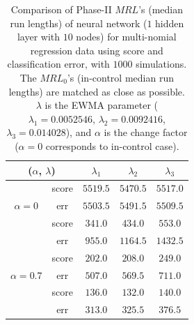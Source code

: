 \documentclass[twoside,11pt]{article}
\begin{document}
\begin{table}[!t]
\centering
\begin{tabular}{ccccc}
\toprule
\multicolumn{2}{c}{($ \alpha$, $ \lambda$)} & {$ \lambda_1$} & {$ \lambda_2$} & {$ \lambda_3$} \\
\midrule
\multirow{3}{*}{$\alpha=0$} & score &$5519.5$ & $5470.5$ & $5517.0$ \\
& err &$5503.5$ & $5491.5$ & $5509.5$ \\
\midrule
\multirow{3}{*}{$\alpha=0.5$} & score &$ \bm{341.0}$ & $\bm{434.0}$ & $\bm{553.0}$ \\
& err &$955.0$ & $1164.5$ & $1432.5$ \\
\midrule
\multirow{3}{*}{$\alpha=0.7$} & score &$\bm{202.0}$ & $\bm{208.0}$ & $\bm{249.0}$ \\
& err &$507.0$ & $569.5$ & $711.0$ \\
\midrule
\multirow{3}{*}{$\alpha=0.9$} & score &$\bm{136.0}$ & $\bm{132.0}$ & $\bm{140.0}$ \\
& err &$313.0$ & $325.5$ & $376.5$ \\
\midrule
\end{tabular}
\caption{Comparison of Phase-II $MRL$'s (median run lengths) of neural network ($1$ hidden layer with $10$ nodes) for multi-nomial regression data using score and classification error, with $1000$ simulations. The $MRL_0$'s (in-control median run lengths) are matched as close as possible. $ \lambda$ is the EWMA parameter ({$ \lambda_1 =0.0052546$}, {$ \lambda_2=0.0092416$}, {$ \lambda_3 =0.014028$}), and $ \alpha$ is the change factor ($ \alpha=0$ corresponds to in-control case).}
\label{tab:multi_logi_nnet_MRL}
\end{table}
\end{document}
